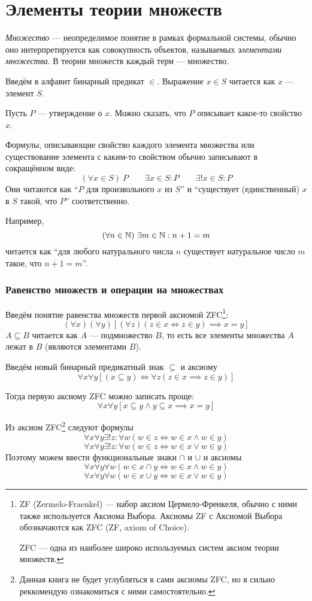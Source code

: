 \part{Элементы теории множеств}

{\it Множество} --- неопределимое понятие в рамках формальной системы,
обычно оно интерпретируется как совокупность объектов,
называемых {\it элементами множества}.
В теории множеств каждый терм --- множество.

Введём в алфавит бинарный предикат $\in$. Выражение $x\in S$ читается
как $x$ --- элемент $S$.

Пусть $P$ --- утверждение о $x$. Можно сказать, что $P$ описывает какое-то
свойство $x$.

Формулы, описывающие свойство каждого элемента множества или
существование элемента с каким-то свойством обычно записывают в сокращённом виде:
\[
	(\forall x\in S)~P\qquad \exists x\in S:P\qquad \exists!x\in S:P
\]
Они читаются как ``$P$ для произвольного $x$ из $S$'' и
``существует (единственный) $x$ в $S$ такой, что $P$'' соответственно.

Например,
\[
	(\forall n\in\mathbb N)~\exists m\in\mathbb N:n+1=m
\]
читается как ``для любого натурального числа $n$ существует натуральное число
$m$ такое, что $n+1=m$''.

\section{Равенство множеств и операции на множествах}

Введём понятие равенства множеств первой аксиомой ZFC\footnote{
	ZF (Zermelo-Fraenkel) --- набор аксиом Цермело-Френкеля, обычно с ними также
	используется Аксиома Выбора. Аксиомы ZF с Аксиомой Выбора
	обозначаются как ZFC (ZF, axiom of Choice).

	ZFC --- одна из наиболее широко используемых систем аксиом теории множеств.
}:
\[
	(\forall x)(\forall y)[(\forall z)(z\in x\iff z\in y)\implies x=y]
\]
$A\subseteq B$ читается как $A$ --- подмножество $B$, то есть все
элементы множества $A$ лежат в $B$ (являются элементами $B$).

Введём новый бинарный предикатный знак $\subseteq$ и аксиому
\[
	\forall x\forall y[(x\subseteq y)\iff \forall z(z\in x\implies z\in y)]
\]

Тогда первую аксиому ZFC можно записать проще:
\[
	\forall x\forall y[x\subseteq y\land y\subseteq x\implies x=y]
\]

Из аксиом ZFC\footnote{
	Данная книга не будет углубляться в сами аксиомы ZFC, но я сильно реккомендую
	ознакомиться с ними самостоятельно.
} следуют формулы
\[
	\forall x\forall y\exists! z:\forall w(w\in z\iff w\in x\land w\in y)
\]
\[
	\forall x\forall y\exists! z:\forall w(w\in z\iff w\in x\lor w\in y)
\]
Поэтому можем ввести функциональные знаки $\cap$ и $\cup$ и аксиомы
\[
	\forall x\forall y\forall w(w\in x\cap y\iff w\in x\land w\in y)
\]
\[
	\forall x\forall y\forall w(w\in x\cup y\iff w\in x\lor w\in y)
\]

